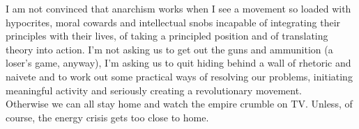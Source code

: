 I am not convinced that anarchism works when I see a movement so loaded with hypocrites, moral cowards and intellectual snobs incapable of integrating their principles with their lives, of taking a principled position and of translating theory into action. I'm not asking us to get out the guns and ammunition (a loser's game, anyway), I'm asking us to quit hiding behind a wall of rhetoric and naivete and to work out some practical ways of resolving our problems, initiating meaningful activity and seriously creating a revolutionary movement.\\
Otherwise we can all stay home and watch the empire crumble on TV. Unless, of course, the energy crisis gets too close to home.